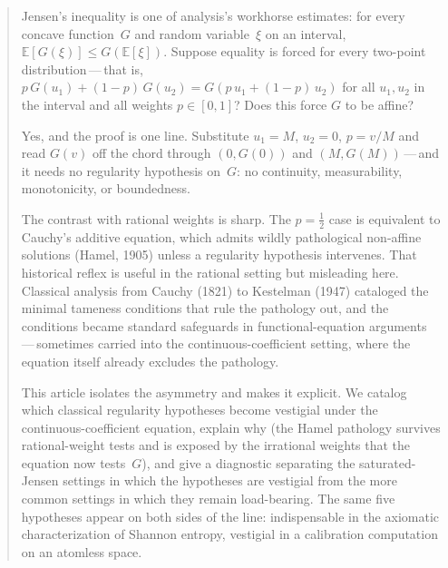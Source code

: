 \documentclass{article}
\theoremstyle{plain}
\theoremstyle{definition}
\newcommand{\E}{\mathbb{E}}
\begin{document}
\author{}

\maketitle

\begin{abstract}
Jensen's inequality is one of analysis's workhorse estimates: for every concave
function~$G$ and random variable~$\xi$ on an interval,
$\E[G(\xi)]\le G(\E[\xi])$. Suppose equality is forced for every
two-point distribution\,---\,that is,
$p\,G(u_1)+(1-p)\,G(u_2)=G(p\,u_1+(1-p)\,u_2)$ for all $u_1,u_2$ in
the interval and all weights $p\in[0,1]$? Does this force $G$ to be affine?

Yes, and the proof is one line. Substitute $u_1=M$, $u_2=0$, $p=v/M$
and read $G(v)$ off the chord through $(0,G(0))$ and
$(M,G(M))$\,---\,and it needs no regularity hypothesis on~$G$: no
continuity, measurability, monotonicity, or boundedness.

The contrast with rational weights is sharp. The $p=\tfrac12$ case is
equivalent to Cauchy's additive equation, which admits wildly
pathological non-affine solutions (Hamel, 1905) unless a regularity
hypothesis intervenes. That historical reflex is useful in the rational setting but misleading here. Classical analysis from Cauchy (1821) to
Kestelman (1947) cataloged the minimal tameness conditions that rule
the pathology out, and the conditions became standard safeguards in
functional-equation arguments\,---\,sometimes carried into the continuous-coefficient setting, where the equation itself already excludes the pathology.

This article isolates the asymmetry and makes it explicit. We catalog which
classical regularity hypotheses become vestigial under the
continuous-coefficient equation, explain why (the Hamel pathology
survives rational-weight tests and is exposed by the irrational weights that the equation now
tests~$G$), and give a diagnostic separating the saturated-Jensen
settings in which the hypotheses are vestigial from the more common
settings in which they remain load-bearing. The same five hypotheses
appear on both sides of the line: indispensable in the axiomatic
characterization of Shannon entropy, vestigial in a calibration
computation on an atomless space.
\end{abstract}
\end{document}
